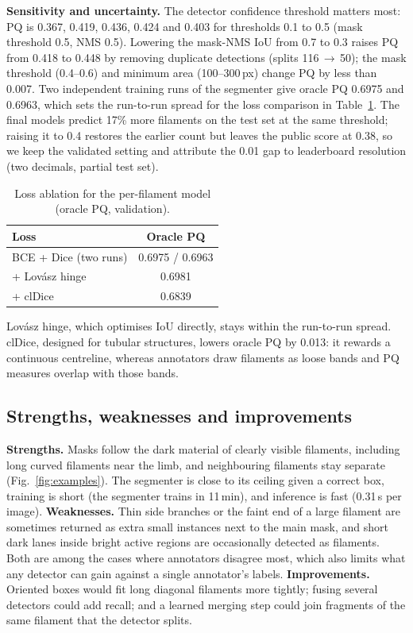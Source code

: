 \documentclass[sigconf]{acmart}
\begin{document}
    \textbf{Sensitivity and uncertainty.} The detector confidence threshold matters most: PQ is 0.367, 0.419, 0.436, 0.424 and 0.403 for thresholds 0.1 to 0.5 (mask threshold 0.5, NMS 0.5). Lowering the mask-NMS IoU from 0.7 to 0.3 raises PQ from 0.418 to 0.448 by removing duplicate detections (splits 116\,$\rightarrow$\,50); the mask threshold (0.4--0.6) and minimum area (100--300\,px) change PQ by less than 0.007. Two independent training runs of the segmenter give oracle PQ 0.6975 and 0.6963, which sets the run-to-run spread for the loss comparison in Table~\ref{tab:loss}. The final models predict 17\% more filaments on the test set at the same threshold; raising it to 0.4 restores the earlier count but leaves the public score at 0.38, so we keep the validated setting and attribute the 0.01 gap to leaderboard resolution (two decimals, partial test set).

\begin{table}[t]
    \caption{Loss ablation for the per-filament model (oracle PQ, validation).}
    \label{tab:loss}
    \small
    \begin{tabular}{lc}
        \toprule
        Loss & Oracle PQ \\
        \midrule
        BCE + Dice (two runs) & 0.6975 / 0.6963 \\
        + Lov\'asz hinge \cite{berman2018lovasz} & 0.6981 \\
        + clDice \cite{shit2021cldice} & 0.6839 \\
        \bottomrule
    \end{tabular}
\end{table}

    Lov\'asz hinge, which optimises IoU directly, stays within the run-to-run spread. clDice, designed for tubular structures, lowers oracle PQ by 0.013: it rewards a continuous centreline, whereas annotators draw filaments as loose bands and PQ measures overlap with those bands.

\subsection{Strengths, weaknesses and improvements}
    \textbf{Strengths.} Masks follow the dark material of clearly visible filaments, including long curved filaments near the limb, and neighbouring filaments stay separate (Fig.~\ref{fig:examples}). The segmenter is close to its ceiling given a correct box, training is short (the segmenter trains in 11\,min), and inference is fast (0.31\,s per image).
    \textbf{Weaknesses.} Thin side branches or the faint end of a large filament are sometimes returned as extra small instances next to the main mask, and short dark lanes inside bright active regions are occasionally detected as filaments. Both are among the cases where annotators disagree most, which also limits what any detector can gain against a single annotator's labels.
    \textbf{Improvements.} Oriented boxes would fit long diagonal filaments more tightly; fusing several detectors could add recall; and a learned merging step could join fragments of the same filament that the detector splits.
\end{document}

